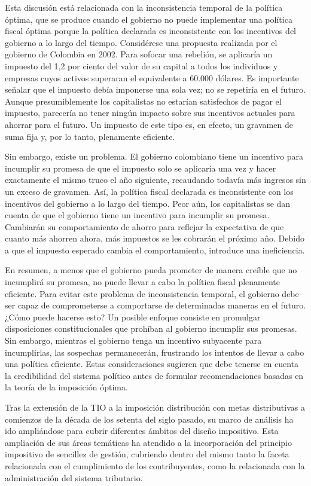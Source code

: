 \documentclass[10pt,a4paper]{article}
\begin{document}
Esta discusión está relacionada con la inconsistencia temporal de la política óptima, que se produce cuando el gobierno no puede implementar una política fiscal óptima porque la política declarada es inconsistente con los incentivos del gobierno a lo largo del tiempo. Considérese una propuesta realizada por el gobierno de Colombia en 2002. Para sofocar una rebelión, se aplicaría un impuesto del 1,2 por ciento del valor de su capital a todos los individuos y empresas cuyos activos superaran el equivalente a 60.000 dólares. Es importante señalar que el impuesto debía imponerse una sola vez; no se repetiría en el futuro. Aunque presumiblemente los capitalistas no estarían satisfechos de pagar el impuesto, parecería no tener ningún impacto sobre sus incentivos actuales para ahorrar para el futuro. Un impuesto de este tipo es, en efecto, un gravamen de suma fija y, por lo tanto, plenamente eficiente.

Sin embargo, existe un problema. El gobierno colombiano tiene un incentivo para incumplir su promesa de que el impuesto solo se aplicaría una vez y hacer exactamente el mismo truco el año siguiente, recaudando todavía más ingresos sin un exceso de gravamen. Así, la política fiscal declarada es inconsistente con los incentivos del gobierno a lo largo del tiempo. Peor aún, los capitalistas se dan cuenta de que el gobierno tiene un incentivo para incumplir su promesa. Cambiarán su comportamiento de ahorro para reflejar la expectativa de que cuanto más ahorren ahora, más impuestos se les cobrarán el próximo año. Debido a que el impuesto esperado cambia el comportamiento, introduce una ineficiencia.

En resumen, a menos que el gobierno pueda prometer de manera creíble que no incumplirá su promesa, no puede llevar a cabo la política fiscal plenamente eficiente. Para evitar este problema de inconsistencia temporal, el gobierno debe ser capaz de comprometerse a comportarse de determinadas maneras en el futuro. ¿Cómo puede hacerse esto? Un posible enfoque consiste en promulgar disposiciones constitucionales que prohíban al gobierno incumplir sus promesas. Sin embargo, mientras el gobierno tenga un incentivo subyacente para incumplirlas, las sospechas permanecerán, frustrando los intentos de llevar a cabo una política eficiente. Estas consideraciones sugieren que debe tenerse en cuenta la credibilidad del sistema político antes de formular recomendaciones basadas en la teoría de la imposición óptima.




Tras la extensión de la TIO a la imposición distribución con metas distributivas a comienzos de la década de los setenta del siglo pasado, su marco de análisis ha ido ampliándose para cubrir diferentes ámbitos del diseño impositivo. Esta ampliación de sus áreas temáticas ha atendido a la incorporación del principio impositivo de sencillez de gestión, cubriendo dentro del mismo tanto la faceta relacionada con el cumplimiento de los contribuyentes, como la relacionada con la administración del sistema tributario.
\end{document}
